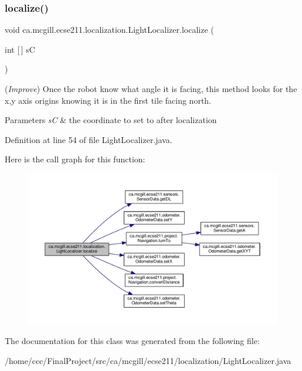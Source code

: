 \subsubsection{\texorpdfstring{localize()}{localize()}}
{\footnotesize\ttfamily void ca.\+mcgill.\+ecse211.\+localization.\+Light\+Localizer.\+localize (\begin{DoxyParamCaption}\item[{int \mbox{[}$\,$\mbox{]}}]{sC }\end{DoxyParamCaption})}

({\itshape Improve}) Once the robot know what angle it is facing, this method looks for the x,y axis origins knowing it is in the first tile facing north. 
\begin{DoxyParams}{Parameters}
{\em sC} & the coordinate to set to after localization \\
\hline
\end{DoxyParams}


Definition at line 54 of file Light\+Localizer.\+java.

Here is the call graph for this function\+:
\nopagebreak
\begin{figure}[H]
\begin{center}
\leavevmode
\includegraphics[width=350pt]{classca_1_1mcgill_1_1ecse211_1_1localization_1_1_light_localizer_a9fc3d6cdd897e9db86fc9d71dc914863_cgraph}
\end{center}
\end{figure}


The documentation for this class was generated from the following file\+:\begin{DoxyCompactItemize}
\item 
/home/ccc/\+Final\+Project/src/ca/mcgill/ecse211/localization/Light\+Localizer.\+java\end{DoxyCompactItemize}
